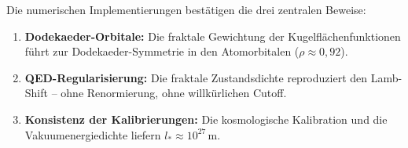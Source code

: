 Die numerischen Implementierungen best\"atigen die drei zentralen Beweise:

\begin{enumerate}
    \item \textbf{Dodekaeder-Orbitale:} Die fraktale Gewichtung der Kugelflächenfunktionen führt zur Dodekaeder-Symmetrie in den Atomorbitalen (\( \rho \approx 0{,}92 \)).
    \item \textbf{QED-Regularisierung:} Die fraktale Zustandsdichte reproduziert den Lamb-Shift -- ohne Renormierung, ohne willkürlichen Cutoff.
    \item \textbf{Konsistenz der Kalibrierungen:} Die kosmologische Kalibration und die Vakuumenergiedichte liefern \( l_* \approx 10^{27} \, \text{m} \).
\end{enumerate}
